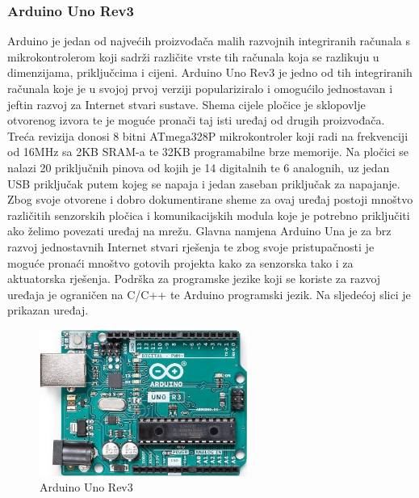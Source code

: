 \documentclass[times, utf8, diplomski]{fer}
\begin{document}
\subsubsection{Arduino Uno Rev3}
Arduino je jedan od najvećih proizvođača malih razvojnih integriranih računala s mikrokontrolerom koji sadrži različite vrste tih računala koja se razlikuju u dimenzijama, priključcima i cijeni. Arduino Uno Rev3\citep{ArduinoUno} je jedno od tih integriranih računala koje je u svojoj prvoj verziji populariziralo i omogućilo jednostavan i jeftin razvoj za Internet stvari sustave. Shema cijele pločice je sklopovlje otvorenog izvora te je moguće pronači taj isti uređaj od drugih proizvođača. Treća revizija donosi 8 bitni ATmega328P mikrokontroler koji radi na frekvenciji od 16MHz sa 2KB SRAM-a te 32KB programabilne brze memorije. Na pločici se nalazi 20 priključnih pinova od kojih je 14 digitalnih te 6 analognih, uz jedan USB priključak putem kojeg se napaja i jedan zaseban priključak za napajanje. Zbog svoje otvorene i dobro dokumentirane sheme za ovaj uređaj postoji mnoštvo različitih senzorskih pločica i komunikacijskih modula koje je potrebno priključiti ako želimo povezati uređaj na mrežu. Glavna namjena Arduino Una je za brz razvoj jednostavnih Internet stvari rješenja te zbog svoje pristupačnosti je moguće pronaći mnoštvo gotovih projekta kako za senzorska tako i za aktuatorska rješenja. Podrška za programske jezike koji se koriste za razvoj uređaja je ograničen na C/C++ te Arduino programski jezik. Na sljedećoj slici je prikazan uređaj. 
\begin{figure}[htb]
    \centering
    \includegraphics[width=6.8cm]{images/arduinouno.jpg}
    \caption{Arduino Uno Rev3\citep{ArduinoUno}}
    \label{fig:arduinouno}
\end{figure}
\end{document}
